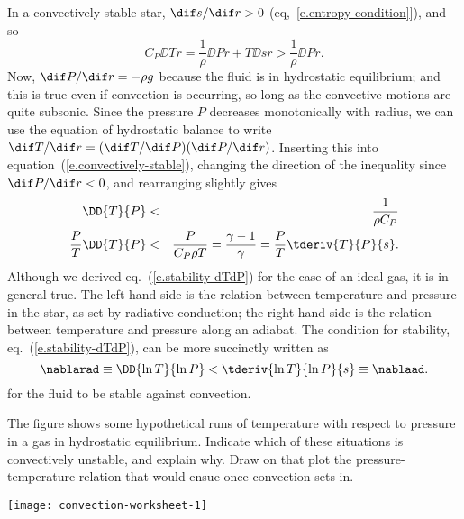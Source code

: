 In a convectively stable star, $\dif s/\dif r > 0$ (eq,~\ref{e.entropy-condition}]), and so 
\begin{equation}\label{e.convectively-stable}
	 C_{P} \DD{T}{r} = \frac{1}{\rho}\DD{P}{r} + T\DD{s}{r} > \frac{1}{\rho}\DD{P}{r}.
\end{equation}
Now, $\dif P/\dif r = -\rho g$ because the fluid is in hydrostatic equilibrium; and this is true even if convection is occurring, so long as the convective motions are quite subsonic.  Since the pressure $P$ decreases monotonically with radius, we can use the equation of hydrostatic balance to write $\dif T/\dif r = (\dif T/\dif P)(\dif P/\dif r)$.
Inserting this into equation~(\ref{e.convectively-stable}), changing the direction of the inequality since $\dif P/\dif r < 0$, and rearranging slightly gives
\begin{eqnarray}
\DD{T}{P} &<& \frac{1}{\rho C_{P}} \nonumber\\
\frac{P}{T}\DD{T}{P} &<& \frac{P}{C_{P}\rho T} = 
\frac{\gamma - 1}{\gamma} = \frac{P}{T}\tderiv{T}{P}{s} .\label{e.stability-dTdP}
\end{eqnarray}
Although we derived eq.~(\ref{e.stability-dTdP}) for the case of an ideal gas, it is in general true. The left-hand side is the relation between temperature and pressure in the star, as set by radiative conduction; the right-hand side is the relation between temperature and pressure along an adiabat.  The condition for stability, eq.~(\ref{e.stability-dTdP}), can be more succinctly written as
\begin{equation}\label{e.stability-del}
\nablarad \equiv \DD{\ln T}{\ln P} < \tderiv{\ln T}{\ln P}{s} \equiv \nablaad.
\end{equation}
for the fluid to be stable against convection.

\begin{exercisebox}
The figure shows some hypothetical runs of temperature with respect to pressure in a gas in hydrostatic equilibrium.  Indicate which of these situations is convectively unstable, and explain why. Draw on that plot the pressure-temperature relation that would ensue once convection sets in.

\texttt{[image: convection-worksheet-1]}
\end{exercisebox}

